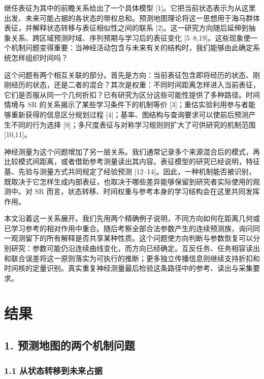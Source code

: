 \documentclass[11pt,a4paper]{article}
\begin{document}
继任表征为其中的前瞻关系给出了一个具体模型
{[}1{]}。它把当前状态表示为从这里出发、未来可能占据的各状态的带权总和。预测地图理论将这一思想用于海马群体表征，并解释状态转移与表征相似性之间的联系
{[}2{]}。这一研究方向随后延伸到抽象关系、跨区域预测时域、序列预期与学习后的表征变化
{[}5–8,19{]}。这些现象使一个机制问题变得重要：当神经活动包含与未来有关的结构时，我们能够由此确定系统怎样组织时间吗？

这个问题有两个相互关联的部分。首先是方向：当前表征包含即将经历的状态、刚刚经历的状态，还是二者的混合？其次是权重：不同时间距离怎样进入当前表征，它们是否服从同一个几何折扣？已有研究为区分这些可能性提供了多种路径。时间情境与
SR 的关系揭示了某些学习条件下的机制等价
{[}3{]}；重估实验利用参与者能够重新获得的信息区分规划过程
{[}4{]}；基率、图结构与查询要求可以使前后预测产生不同的行为选择
{[}9{]}；多尺度表征与对称学习规则则扩大了可供研究的机制范围
{[}10,11{]}。

神经测量为这个问题增加了另一层关系。我们通常记录多个来源混合后的模式，再比较模式间距离，或者借助参考测量读出其内容。表征模型的研究已经说明，特征基、先验与测量方式共同规定了经验预测
{[}12–14{]}。因此，一种机制能否被识别，既取决于它怎样生成内部表征，也取决于哪些差异能够保留到研究者实际使用的观测中。对
SR 而言，状态转移、时间权重与参考本身的学习结构会在这里共同发挥作用。

本文沿着这一关系展开。我们先用两个精确例子说明，不同方向如何在距离几何或已学习参考的相对作用中重合。随后考察全部合法参数产生的连续预测族，询问同一观测留下的所有解释是否共享某种性质。这个问题使方向判断与参数恢复可以分别研究：参数可能仍沿连续曲线变化，而方向已经确定。互反任务、任务相容读出和联合误差将这一原则落实为可执行的推断；更多独立传播信息则继续支持折扣和时间核的定量识别。真实重复神经测量最后检验这条路径中的参考、读出与采集要求。

\section{结果}\label{ux7ed3ux679c}

\subsection{1.
预测地图的两个机制问题}\label{ux9884ux6d4bux5730ux56feux7684ux4e24ux4e2aux673aux5236ux95eeux9898}

\subsubsection{1.1
从状态转移到未来占据}\label{ux4eceux72b6ux6001ux8f6cux79fbux5230ux672aux6765ux5360ux636e}
\end{document}
